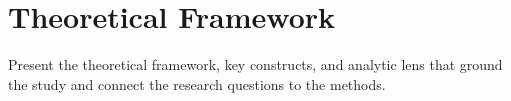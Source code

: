 \section{Theoretical Framework}\label{sec:framework}


Present the theoretical framework, key constructs, and analytic lens that ground
the study and connect the research questions to the methods.
